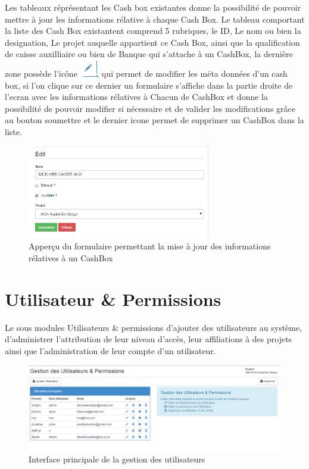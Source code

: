 \documentclass[12pt,a4paper]{report}
\begin{document}
Les tableaux réprésentant les Cash box existantes donne la possibilité de pouvoir mettre à jour les informations rélative à chaque Cash Box. Le tableau comportant la liste des Cash Box existantent comprend 5 rubriques, le ID, Le nom ou bien la designation, Le projet auquelle appartient ce Cash Box, ainsi que la qualification de caisse auxilliaire ou bien de Banque qui s'attache à un CashBox, la dernière  zone possède l'icône \includegraphics[scale=0.7]{pic/EditUser.png}, qui permet de modifier les méta données d'un cash box, si l'on clique sur ce dernier un formulaire s'affiche dans la partie droite de l'ecran avec les informations rélatives à Chacun de CashBox et donne la possibilité de pouvoir modifier si nécessaire et de valider les modifications grâce au bouton soumettre et le dernier icone permet de supprimer un CashBox dans la liste.

\begin{figure}[h]
\begin{center}
\includegraphics[width=8cm]{pic/EditCashBox.png}
\end{center}
\caption{Apperçu du formulaire permettant la mise à jour des informations rélatives à un CashBox}
\label{Apperçu du formulaire permettant la mise à jour des informations rélatives à un CashBox}
\end{figure} 


\newpage
\section{Utilisateur \& Permissions}
Le sous modules Utilisateurs \& permissions d'ajouter des utilisateurs au système, d'administrer l'attribution de leur niveau d'accès, leur affiliations à des projets ainsi que l'administration de leur compte d'un utilisateur.

\begin{figure}[h]
\begin{center}
\includegraphics[width=14cm]{pic/userAllow.png}
\end{center}
\caption{Interface principale de la gestion des utilisateurs}
\label{Interface principale de la gestion des utilisateurs}
\end{figure} 
\end{document}
